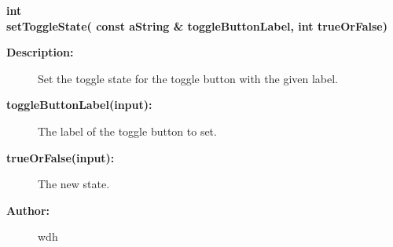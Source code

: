 \begin{flushleft} \textbf{%
int  \\ 
\settowidth{\DialogDataIncludeArgIndent}{setToggleState(}%
setToggleState( const aString \& toggleButtonLabel,  int trueOrFalse)
}\end{flushleft}
\begin{description}
\item[{\bf Description:}]  Set the toggle state for the toggle button with the given label.

\item[{\bf toggleButtonLabel(input):}]  The label of the toggle button to set.
\item[{\bf trueOrFalse(input):}]  The new state.

\item[{\bf Author:}]  wdh
\end{description}
